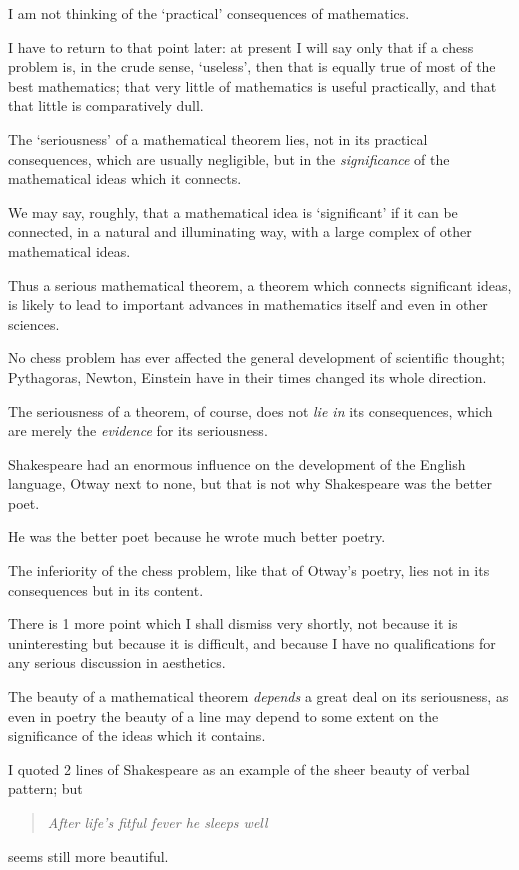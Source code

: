 \documentclass{article}
\numberwithin{equation}{section}
\begin{document}
%
I am not thinking of the `practical' consequences of mathematics.

I have to return to that point later: at present I will say only that if a chess problem is, in the crude sense, `useless', then that is equally true of most of the best mathematics; that very little of mathematics is useful practically, and that that little is comparatively dull.

The `seriousness' of a mathematical theorem lies, not in its practical consequences, which are usually negligible, but in the \textit{significance} of the mathematical ideas which it connects.

We may say, roughly, that a mathematical idea is `significant' if it can be connected, in a natural and illuminating way, with a large complex of other mathematical ideas.

Thus a serious mathematical theorem, a theorem which connects significant ideas, is likely to lead to important advances in mathematics itself and even in other sciences.

No chess problem has ever affected the general development of scientific thought; Pythagoras, Newton, Einstein have in their times changed its whole direction.

%
The seriousness of a theorem, of course, does not \textit{lie in} its consequences, which are merely the \textit{evidence} for its seriousness.

Shakespeare had an enormous influence on the development of the English language, Otway next to none, but that is not why Shakespeare was the better poet.

He was the better poet because he wrote much better poetry.

The inferiority of the chess problem, like that of Otway's poetry, lies not in its consequences but in its content.

%
There is 1 more point which I shall dismiss very shortly, not because it is uninteresting but because it is difficult, and because I have no qualifications for any serious discussion in aesthetics.

The beauty of a mathematical theorem \textit{depends} a great deal on its seriousness, as even in poetry the beauty of a line may depend to some extent on the significance of the ideas which it contains.

I quoted 2 lines of Shakespeare as an example of the sheer beauty of verbal pattern; but
\begin{quotation}
    \textit{After life's fitful fever he sleeps well}
\end{quotation}
seems still more beautiful.
\end{document}
